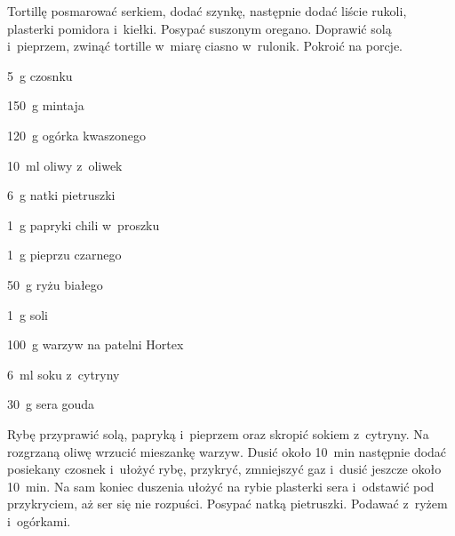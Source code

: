\documentclass[../kucharek.tex]{subfiles}
\begin{document}
Tortillę posmarować serkiem, dodać szynkę, następnie dodać liście rukoli,
plasterki pomidora i~kiełki. Posypać suszonym oregano. Doprawić solą
i~pieprzem, zwinąć tortille w~miarę ciasno w~rulonik. Pokroić na porcje.


\begin{Ingred}
    \item \qty{5}{\gram} czosnku
    \item \qty{150}{\gram} mintaja
    \item \qty{120}{\gram} ogórka kwaszonego
    \item \qty{10}{\milli\litre} oliwy z~oliwek
    \item \qty{6}{\gram} natki pietruszki
    \item \qty{1}{\gram} papryki chili w~proszku
    \item \qty{1}{\gram} pieprzu czarnego
    \item \qty{50}{\gram} ryżu białego
    \item \qty{1}{\gram} soli
    \item \qty{100}{\gram} warzyw na patelni Hortex
    \item \qty{6}{\milli\litre} soku z~cytryny
    \item \qty{30}{\gram} sera gouda
\end{Ingred}

Rybę przyprawić solą, papryką i~pieprzem oraz skropić sokiem z~cytryny. Na
rozgrzaną oliwę wrzucić mieszankę warzyw. Dusić około \qty{10}{\minute}
następnie dodać posiekany czosnek i~ułożyć rybę, przykryć, zmniejszyć gaz
i~dusić jeszcze około \qty{10}{\minute}. Na sam koniec duszenia ułożyć na rybie
plasterki sera i~odstawić pod przykryciem, aż ser się nie rozpuści. Posypać
natką pietruszki. Podawać z~ryżem i~ogórkami.

\end{document}
